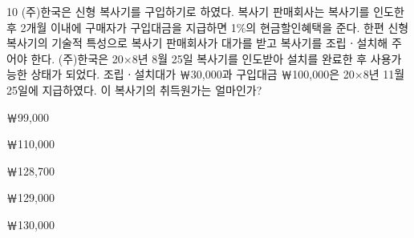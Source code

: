 \begin{question}{10}
(주)한국은 신형 복사기를 구입하기로 하였다. 복사기 판매회사는 복사기를 인도한 후 2개월 이내에 구매자가 구입대금을 지급하면 1\%의 현금할인혜택을 준다. 한편 신형 복사기의 기술적 특성으로 복사기 판매회사가 대가를 받고 복사기를 조립ㆍ설치해 주어야 한다. (주)한국은 20×8년 8월 25일 복사기를 인도받아 설치를 완료한 후 사용가능한 상태가 되었다. 조립ㆍ설치대가 ￦30,000과 구입대금 ￦100,000은 20×8년 11월 25일에 지급하였다. 이 복사기의 취득원가는 얼마인가?
\begin{choices}
  \item ￦99,000
  \item ￦110,000
  \item ￦128,700
  \item ￦129,000
  \item ￦130,000
\end{choices}
\end{question}
